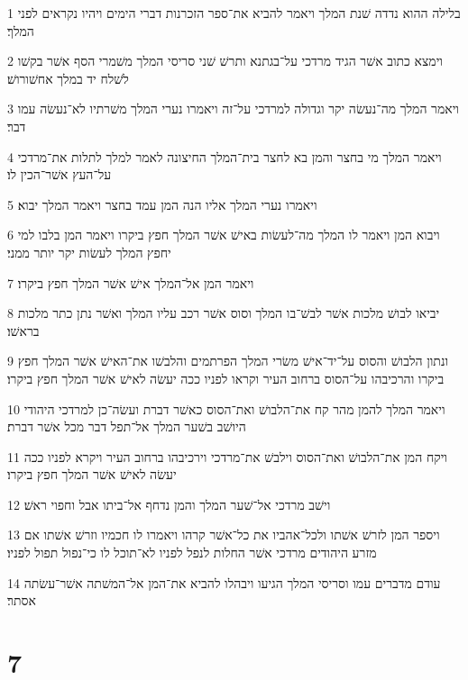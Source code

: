 \par 1 בלילה ההוא נדדה שׁנת המלך ויאמר להביא את־ספר הזכרנות דברי הימים ויהיו נקראים לפני המלך׃
\par 2 וימצא כתוב אשׁר הגיד מרדכי על־בגתנא ותרשׁ שׁני סריסי המלך משׁמרי הסף אשׁר בקשׁו לשׁלח יד במלך אחשׁורושׁ׃
\par 3 ויאמר המלך מה־נעשׂה יקר וגדולה למרדכי על־זה ויאמרו נערי המלך משׁרתיו לא־נעשׂה עמו דבר׃
\par 4 ויאמר המלך מי בחצר והמן בא לחצר בית־המלך החיצונה לאמר למלך לתלות את־מרדכי על־העץ אשׁר־הכין לו׃
\par 5 ויאמרו נערי המלך אליו הנה המן עמד בחצר ויאמר המלך יבוא׃
\par 6 ויבוא המן ויאמר לו המלך מה־לעשׂות באישׁ אשׁר המלך חפץ ביקרו ויאמר המן בלבו למי יחפץ המלך לעשׂות יקר יותר ממני׃
\par 7 ויאמר המן אל־המלך אישׁ אשׁר המלך חפץ ביקרו׃
\par 8 יביאו לבושׁ מלכות אשׁר לבשׁ־בו המלך וסוס אשׁר רכב עליו המלך ואשׁר נתן כתר מלכות בראשׁו׃
\par 9 ונתון הלבושׁ והסוס על־יד־אישׁ משׂרי המלך הפרתמים והלבשׁו את־האישׁ אשׁר המלך חפץ ביקרו והרכיבהו על־הסוס ברחוב העיר וקראו לפניו ככה יעשׂה לאישׁ אשׁר המלך חפץ ביקרו׃
\par 10 ויאמר המלך להמן מהר קח את־הלבושׁ ואת־הסוס כאשׁר דברת ועשׂה־כן למרדכי היהודי היושׁב בשׁער המלך אל־תפל דבר מכל אשׁר דברת׃
\par 11 ויקח המן את־הלבושׁ ואת־הסוס וילבשׁ את־מרדכי וירכיבהו ברחוב העיר ויקרא לפניו ככה יעשׂה לאישׁ אשׁר המלך חפץ ביקרו׃
\par 12 וישׁב מרדכי אל־שׁער המלך והמן נדחף אל־ביתו אבל וחפוי ראשׁ׃
\par 13 ויספר המן לזרשׁ אשׁתו ולכל־אהביו את כל־אשׁר קרהו ויאמרו לו חכמיו וזרשׁ אשׁתו אם מזרע היהודים מרדכי אשׁר החלות לנפל לפניו לא־תוכל לו כי־נפול תפול לפניו׃
\par 14 עודם מדברים עמו וסריסי המלך הגיעו ויבהלו להביא את־המן אל־המשׁתה אשׁר־עשׂתה אסתר׃

\chapter{7}

